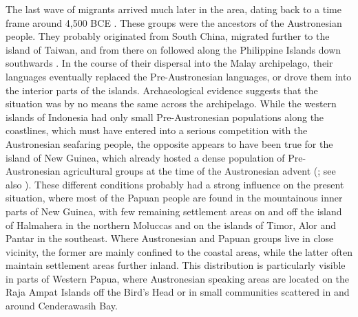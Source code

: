 The last wave of migrants arrived much later in the  area, dating back to a time frame around 4,500 BCE \citep{Bellwood1998, Bellwood2007}. These groups were the ancestors of the Austronesian people. They probably originated from South China, migrated further to the island of Taiwan, and from there on followed along the Philippine Islands down southwards \citep{Tryon1995, capelli2001}. In the course of their dispersal into the Malay archipelago, their languages eventually replaced the Pre-Austronesian languages, or drove them into the interior parts of the islands. Archaeological evidence suggests that the situation was by no means the same across the  archipelago. While the western islands of Indonesia had only small Pre-Austronesian populations along the coastlines, which must have entered into a serious competition with the Austronesian seafaring people, the opposite appears to have been true for the island of New Guinea, which already hosted a dense population of Pre-Austronesian agricultural groups at the time of the Austronesian advent (\citealt{Bellwood1998}; see also \citealt{Ross2005}). These different conditions probably had a strong influence on the present situation, where most of the Papuan people are found in the mountainous inner parts of New Guinea, with few remaining settlement areas on and off the island of Halmahera in the northern Moluccas and on the islands of Timor, Alor and Pantar in the southeast. Where Austronesian and Papuan groups live in close vicinity, the former are mainly confined to the coastal areas, while the latter often maintain settlement areas further inland. This distribution is particularly visible in parts of Western Papua, where Austronesian speaking areas are located on the Raja Ampat Islands off the Bird's Head or in small communities scattered in and around Cenderawasih Bay.


